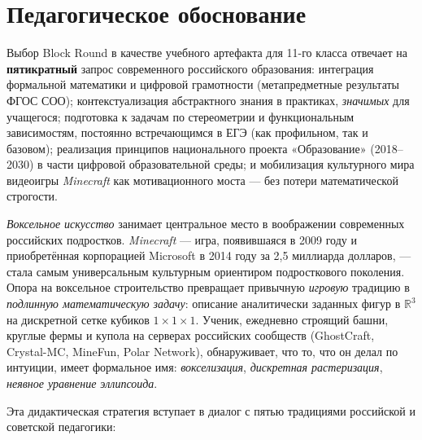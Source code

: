 \documentclass[12pt,a4paper]{scrartcl}
\newcommand{\acc}[1]{\textcolor{accent}{\textbf{#1}}}
\begin{document}
\section{Педагогическое обоснование}\label{sec:justificativa}

Выбор Block Round в качестве учебного артефакта для 11-го класса отвечает на \acc{пятикратный} запрос современного российского образования: интеграция формальной математики и цифровой грамотности (метапредметные результаты ФГОС СОО); контекстуализация абстрактного знания в практиках, \emph{значимых} для учащегося; подготовка к задачам по стереометрии и функциональным зависимостям, постоянно встречающимся в ЕГЭ (как профильном, так и базовом); реализация принципов национального проекта «Образование» (2018--2030) в части цифровой образовательной среды; и мобилизация культурного мира видеоигры \emph{Minecraft} как мотивационного моста --- без потери математической строгости.

\emph{Воксельное искусство} занимает центральное место в воображении современных российских подростков. \emph{Minecraft} --- игра, появившаяся в 2009 году и приобретённая корпорацией Microsoft в 2014 году за 2{,}5 миллиарда долларов, --- стала самым универсальным культурным ориентиром подросткового поколения. Опора на воксельное строительство превращает привычную \emph{игровую} традицию в \emph{подлинную математическую задачу}: описание аналитически заданных фигур в $\mathbb{R}^3$ на дискретной сетке кубиков $1\times1\times1$. Ученик, ежедневно строящий башни, круглые фермы и купола на серверах российских сообществ (GhostCraft, Crystal-MC, MineFun, Polar Network), обнаруживает, что то, что он делал по интуиции, имеет формальное имя: \emph{воксе\-лизация}, \emph{дискретная растеризация}, \emph{неявное уравнение эллипсоида}.

Эта дидактическая стратегия вступает в диалог с пятью традициями российской и советской педагогики:
\end{document}
